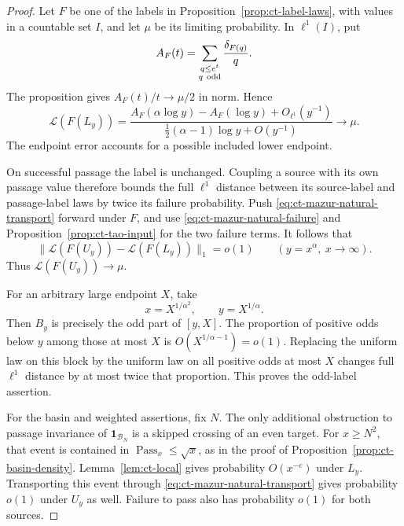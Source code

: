 \documentclass[11pt,a4paper]{article}
\begin{document}
\begin{proof}
Let \(F\) be one of the labels in
Proposition~\ref{prop:ct-label-laws}, with values in a countable set
\(I\), and let \(\mu\) be its limiting probability. In
\(\ell^1(I)\), put
\[
 A_F(t)=\sum_{\substack{q\le e^t\\q\ {\rm odd}}}
                         \frac{\delta_{F(q)}}q.
\]
The proposition gives \(A_F(t)/t\to\mu/2\) in norm. Hence
\[
 \mathcal L(F(L_y))
 =\frac{A_F(\alpha\log y)-A_F(\log y)+O_{\ell^1}(y^{-1})}
        {\tfrac12(\alpha-1)\log y+O(y^{-1})}
 \longrightarrow\mu.
\]
The endpoint error accounts for a possible included lower endpoint.

On successful passage the label is unchanged. Coupling a source
with its own passage value therefore bounds the full \(\ell^1\)
distance between its source-label and passage-label laws by twice
its failure probability. Push
\eqref{eq:ct-mazur-natural-transport} forward under \(F\), and
use \eqref{eq:ct-mazur-natural-failure} and
Proposition~\ref{prop:ct-tao-input} for the two failure terms.
It follows that
\[
 \|\mathcal L(F(U_y))-\mathcal L(F(L_y))\|_1=o(1)
 \qquad(y=x^\alpha,\ x\to\infty).
\]
Thus \(\mathcal L(F(U_y))\to\mu\).

For an arbitrary large endpoint \(X\), take
\[
 x=X^{1/\alpha^2},\qquad y=X^{1/\alpha}.
\]
Then \(B_y\) is precisely the odd part of \([y,X]\).
The proportion of positive odds below \(y\) among those at most
\(X\) is \(O(X^{1/\alpha-1})=o(1)\). Replacing the uniform
law on this block by the uniform law on all positive odds at most
\(X\) changes full \(\ell^1\) distance by at most twice that
proportion. This proves the odd-label assertion.

For the basin and weighted assertions, fix \(N\). The only
additional obstruction to passage invariance of
\(\mathbf1_{\mathcal B_N}\) is a skipped crossing of an even
target. For \(x\ge N^2\), that event is contained in
\(\operatorname{Pass}_x\le\sqrt x\), as in the proof of
Proposition~\ref{prop:ct-basin-density}. Lemma~\ref{lem:ct-local}
gives probability \(O(x^{-c})\) under \(L_y\).
Transporting this event through
\eqref{eq:ct-mazur-natural-transport} gives probability \(o(1)\)
under \(U_y\) as well. Failure to pass also has probability
\(o(1)\) for both sources.


\end{proof}
\end{document}
